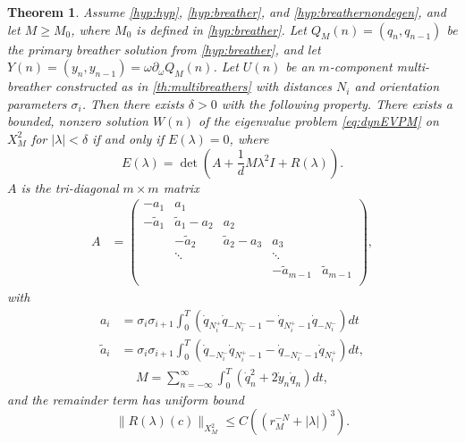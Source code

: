 \documentclass[12pt,reqno]{amsart}
\newtheorem{theorem}{Theorem}
\theoremstyle{definition}
\begin{document}
\begin{theorem}\label{th:spectrum}
Assume \cref{hyp:hyp}, \cref{hyp:breather}, and \cref{hyp:breathernondegen}, and let $M \geq M_0$, where $M_0$ is defined in \cref{hyp:breather}. Let $Q_M(n) = (q_n, q_{n-1})$ be the primary breather solution from \cref{hyp:breather}, and let $Y(n) = (y_n, y_{n-1}) = \omega \partial_\omega Q_M(n)$.
Let $U(n)$ be an $m$-component multi-breather constructed as in \cref{th:multibreathers} with distances $N_i$ and orientation parameters $\sigma_i$. Then there exists $\delta > 0$ with the following property. There exists a bounded, nonzero solution $W(n)$ of the eigenvalue problem \cref{eq:dynEVPM} on $X_M^2$ for $|\lambda| < \delta$ if and only if $E(\lambda) = 0$, where
\begin{equation}\label{Elambda}
E(\lambda) = \det\left(A + \frac{1}{d}M \lambda^2 I + R(\lambda)\right).
\end{equation}
$A$ is the tri-diagonal $m \times m$ matrix
\begin{align}\label{eq:matrixA}
A &= \begin{pmatrix}
-a_1 & a_1 & & & \\
-\tilde{a}_1 & \tilde{a}_1 - a_2 & a_2 \\
& -\tilde{a}_2 & \tilde{a}_2 - a_3 & a_3 \\
& \ddots & & \ddots \\
& & & -\tilde{a}_{m-1} & \tilde{a}_{m-1}  \\
\end{pmatrix},
\end{align}
with
\begin{equation}\label{eq:ai}
\begin{aligned}
a_i &= \sigma_i \sigma_{i+1} \int_0^T \left( \dot{q}_{N_i^+}\dot{q}_{-N_i^- - 1} 
- \dot{q}_{N_i^+ - 1}\dot{q}_{-N_i^-} \right) dt \\
\tilde{a}_i &= \sigma_i \sigma_{i+1} \int_0^T \left( \dot{q}_{-N_i^-} \dot{q}_{N_i^+ - 1} 
- \dot{q}_{-N_i^- - 1}\dot{q}_{N_i^+} \right) dt,
\end{aligned}
\end{equation}
\begin{align}\label{eq:M}
M =
\sum_{n = -\infty}^\infty \int_0^T \left( \dot{q}_n^2 + 2 \dot{y}_n \dot{q}_n \right) dt,
\end{align}
and the remainder term has uniform bound
\begin{equation}\label{eq:Rbound}
\|R(\lambda)(c)\|_{X_M^2} \leq C \left( (r_M^{-N} + |\lambda|)^3\right).
\end{equation}
\end{theorem}
\end{document}
